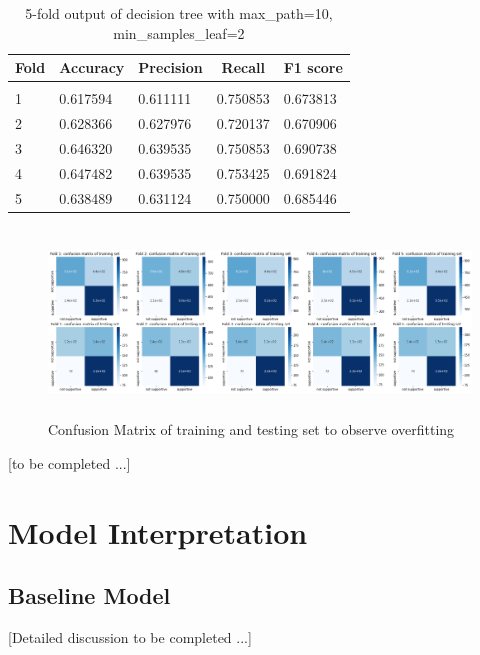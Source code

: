 \documentclass{article} %
\begin{document}
\begin{table}[H]
	\caption{5-fold output of decision tree with max\_path=10, min\_samples\_leaf=2}
	\label{sample-table}
	\begin{center}
		\begin{tabular}{|l|l|l|l|l|}
			\multicolumn{1}{c}{\bf Fold}  
			&\multicolumn{1}{c}{\bf Accuracy}
			&\multicolumn{1}{c}{\bf Precision} 
			&\multicolumn{1}{c}{\bf Recall}
			&\multicolumn{1}{c}{\bf F1 score}
			\\ \hline & & & & \\
			1        &0.617594	&0.611111	&0.750853	&0.673813 \\
			2        &0.628366	&0.627976	&0.720137	&0.670906 \\
			3        &0.646320	&0.639535	&0.750853	&0.690738 \\
			4        &0.647482	&0.639535	&0.753425	&0.691824 \\
			5        &0.638489	&0.631124	&0.750000	&0.685446 \\
			\hline
		\end{tabular}
	\end{center}
\end{table}


\begin{figure}[H]
	\includegraphics[height=5cm, width=17cm]{1.png}
	\caption{Confusion Matrix of training and testing set to observe overfitting}
\end{figure}


[to be completed ...]


\section{Model Interpretation}

\subsection{Baseline Model}


[Detailed discussion to be completed ...]
\end{document}
